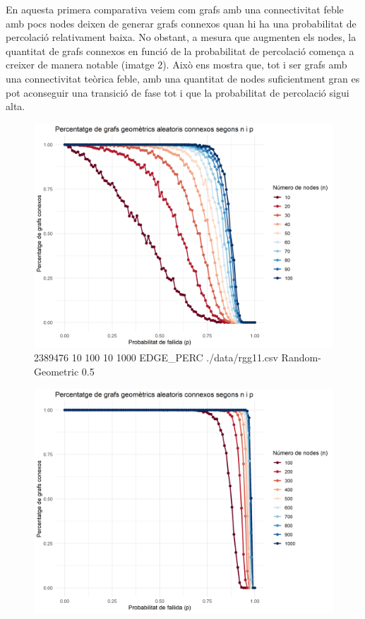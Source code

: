 \documentclass[a4paper]{article}
\begin{document}
	En aquesta primera comparativa veiem com grafs amb una connectivitat feble amb pocs nodes deixen de generar grafs connexos quan hi ha una probabilitat de percolació relativament baixa. No obstant, a mesura que augmenten els nodes, la quantitat de grafs connexos
	en funció de la probabilitat de percolació comença a creixer de manera notable (imatge 2). Això ens mostra que, tot i ser grafs amb una connectivitat teòrica feble, amb una quantitat de nodes suficientment gran es pot aconseguir una transició de fase tot i que la probabilitat
	de percolació sigui alta. 

	\begin{figure}[h]
		\centering
		\begin{minipage}{0.45\textwidth}
			\centering
			\includegraphics[width=\textwidth]{images/randomGeometric_10-100_0.5}
			\footnotesize{2389476 10 100 10 1000 EDGE\_PERC ./data/rgg11.csv Random-Geometric 0.5}
		\end{minipage}
		\hfill
		\begin{minipage}{0.45\textwidth}
			\centering
			\includegraphics[width=\textwidth]{images/randomGeometric_100-1000_0.5}

\end{minipage}
\end{figure}
\end{document}
